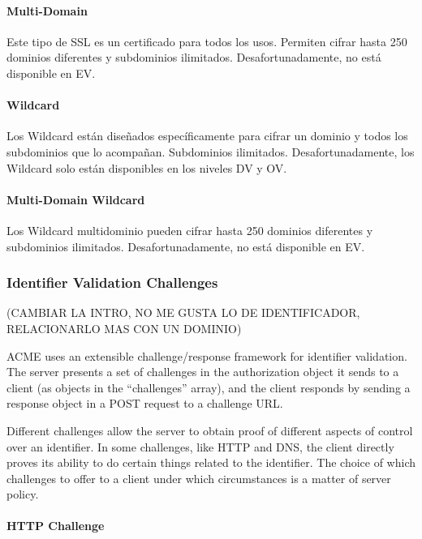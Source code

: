   \paragraph*{Multi-Domain}
  Este tipo de SSL es un certificado para todos los usos. Permiten cifrar 
  hasta 250 dominios diferentes y subdominios 
  ilimitados. Desafortunadamente, no está disponible en EV.
  
  \paragraph*{Wildcard}
  
  Los Wildcard están diseñados específicamente para cifrar un dominio y 
  todos los subdominios que lo acompañan. Subdominios ilimitados. 
  Desafortunadamente, los Wildcard solo están disponibles en los 
  niveles DV y OV.
  
  \paragraph*{Multi-Domain Wildcard}
  Los Wildcard multidominio pueden cifrar hasta 250 dominios diferentes 
  y subdominios ilimitados. Desafortunadamente, no está disponible en EV.

  
\subsubsection*{Identifier Validation Challenges}

(CAMBIAR LA INTRO, NO ME GUSTA LO DE IDENTIFICADOR, RELACIONARLO MAS CON UN DOMINIO)

ACME uses an extensible challenge/response framework for identifier
validation.  The server presents a set of challenges in the
authorization object it sends to a client (as objects in the
“challenges” array), and the client responds by sending a response
object in a POST request to a challenge URL.

   Different challenges allow the server to obtain proof of different
   aspects of control over an identifier.  In some challenges, like HTTP
   and DNS, the client directly proves its ability to do certain things
   related to the identifier.  The choice of which challenges to offer
   to a client under which circumstances is a matter of server policy.


   

\paragraph*{HTTP Challenge}

